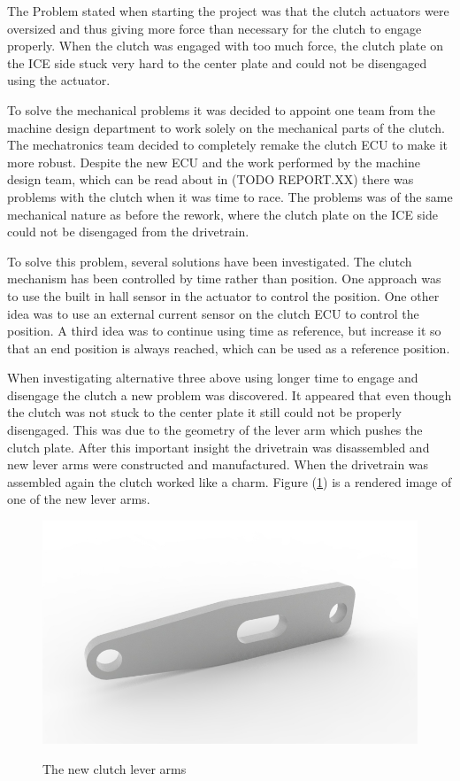 The Problem stated when starting the project was that the clutch actuators were oversized and thus giving more force than necessary for the clutch to engage properly. When the clutch was engaged with too much force, the clutch plate on the ICE side stuck very hard to the center plate and could not be disengaged using the actuator.

To solve the mechanical problems it was decided to appoint one team from the machine design department to work solely on the mechanical parts of the clutch. The mechatronics team decided to completely remake the clutch ECU to make it more robust. Despite the new ECU and the work performed by the machine design team, which can be read about in (TODO REPORT.XX) there was problems with the clutch when it was time to race. The problems was of the same mechanical nature as before the rework, where the clutch plate on the ICE side could not be disengaged from the drivetrain.

To solve this problem, several solutions have been investigated. The clutch mechanism has been controlled by time rather than position. One approach was to use the built in hall sensor in the actuator to control the position. One other idea was to use an external current sensor on the clutch ECU to control the position. A third idea was to continue using time as reference, but increase it so that an end position is always reached, which can be used as a reference position.

When investigating alternative three above using longer time to engage and disengage the clutch a new problem was discovered. It appeared that even though the clutch was not stuck to the center plate it still could not be properly disengaged. This was due to the geometry of the lever arm which pushes the clutch plate.  After this important insight the drivetrain was disassembled and new lever arms were constructed and manufactured. When the drivetrain was assembled again the clutch worked like a charm. Figure (\ref{fig:clutch}) is a rendered image of one of the new lever arms.

\begin{figure}[H]
    \centering\label{fig:clutch}
    \includegraphics[width=1\textwidth]{./img/clutch}
    \caption{The new clutch lever arms}
\end{figure}

